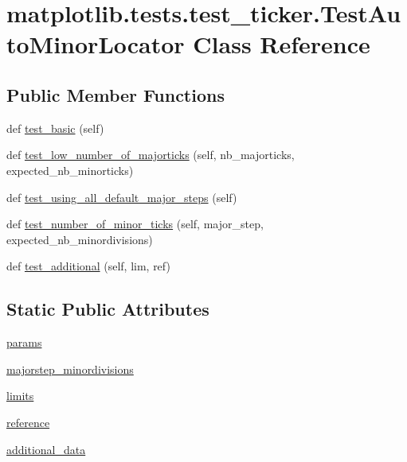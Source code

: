 \hypertarget{classmatplotlib_1_1tests_1_1test__ticker_1_1TestAutoMinorLocator}{}\section{matplotlib.\+tests.\+test\+\_\+ticker.\+Test\+Auto\+Minor\+Locator Class Reference}
\label{classmatplotlib_1_1tests_1_1test__ticker_1_1TestAutoMinorLocator}
\subsection*{Public Member Functions}
\begin{DoxyCompactItemize}
\item 
def \hyperlink{classmatplotlib_1_1tests_1_1test__ticker_1_1TestAutoMinorLocator_aa611823df04400dbffd29f2ea3636534}{test\+\_\+basic} (self)
\item 
def \hyperlink{classmatplotlib_1_1tests_1_1test__ticker_1_1TestAutoMinorLocator_a721e9e448093dacfe9a4a6f934bd53b2}{test\+\_\+low\+\_\+number\+\_\+of\+\_\+majorticks} (self, nb\+\_\+majorticks, expected\+\_\+nb\+\_\+minorticks)
\item 
def \hyperlink{classmatplotlib_1_1tests_1_1test__ticker_1_1TestAutoMinorLocator_acf7c74d0ac22c8b7fc2c1f5f8d429d1a}{test\+\_\+using\+\_\+all\+\_\+default\+\_\+major\+\_\+steps} (self)
\item 
def \hyperlink{classmatplotlib_1_1tests_1_1test__ticker_1_1TestAutoMinorLocator_a14d8068575939ec66c2e9c3e2fbb2129}{test\+\_\+number\+\_\+of\+\_\+minor\+\_\+ticks} (self, major\+\_\+step, expected\+\_\+nb\+\_\+minordivisions)
\item 
def \hyperlink{classmatplotlib_1_1tests_1_1test__ticker_1_1TestAutoMinorLocator_a7ab245a88b42e0e13e4185461dd2ad48}{test\+\_\+additional} (self, lim, ref)
\end{DoxyCompactItemize}
\subsection*{Static Public Attributes}
\begin{DoxyCompactItemize}
\item 
\hyperlink{classmatplotlib_1_1tests_1_1test__ticker_1_1TestAutoMinorLocator_a06659b98c500ee7ce43961fe8ac432fe}{params}
\item 
\hyperlink{classmatplotlib_1_1tests_1_1test__ticker_1_1TestAutoMinorLocator_a2d5c954d9831ed4ab4a211ce8d1adf0a}{majorstep\+\_\+minordivisions}
\item 
\hyperlink{classmatplotlib_1_1tests_1_1test__ticker_1_1TestAutoMinorLocator_acbd9f7f0cf7c45485ad32580903db256}{limits}
\item 
\hyperlink{classmatplotlib_1_1tests_1_1test__ticker_1_1TestAutoMinorLocator_a8f3b224c1f3aa62113d481876df2345b}{reference}
\item 
\hyperlink{classmatplotlib_1_1tests_1_1test__ticker_1_1TestAutoMinorLocator_af7c8ae83689d26093d4ea0d9884dc68e}{additional\+\_\+data}
\end{DoxyCompactItemize}


